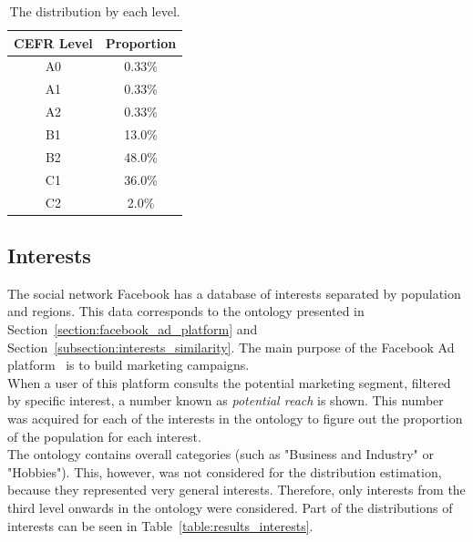 \begin{table}[H]
    \centering
    \begin{tabular}{cc}
    \hline
    CEFR Level & Proportion \\
    \hline
    A0         & 0.33\%     \\
    A1         & 0.33\%     \\
    A2         & 0.33\%     \\
    B1         & 13.0\%     \\
    B2         & 48.0\%     \\
    C1         & 36.0\%     \\
    C2         & 2.0\%      \\
    \hline
    \end{tabular}
    \caption{The distribution by each level.}
    \label{table:results_levels}
\end{table}

\subsection{Interests} 

The social network Facebook has a database of interests separated by population and regions. This data corresponds to the ontology presented in Section~\ref{section:facebook_ad_platform} and Section~\ref{subsection:interests_similarity}. The main purpose of the Facebook Ad platform~\cite{facebook_business} is to build marketing campaigns.\\

When a user of this platform consults the potential marketing segment, filtered by specific interest, a number known as \textit{potential reach} is shown. This number was acquired for each of the interests in the ontology to figure out the proportion of the population for each interest.\\

The ontology contains overall categories (such as "Business and Industry" or "Hobbies"). This, however, was not considered for the distribution estimation, because they represented very general interests. Therefore, only interests from the third level onwards in the ontology were considered. Part of the distributions of interests can be seen in Table~\ref{table:results_interests}. \\

